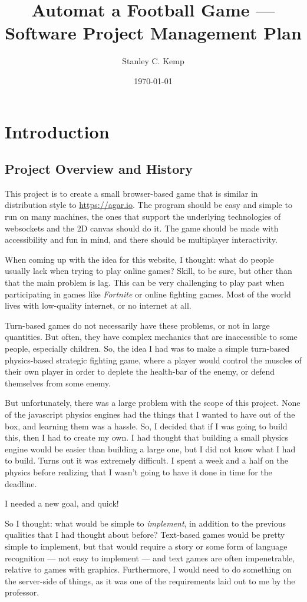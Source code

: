 \documentclass[11pt]{article}
\author{Stanley C. Kemp}
\date{\today}
\title{Automat a Football Game --- Software Project Management Plan}
\begin{document}
\maketitle
\section{Introduction}
\label{sec:org7e693b3}
\subsection{Project Overview and History}
\label{sec:orgcc8e471}
 This project is to create a small browser-based game that is similar in distribution style to \url{https://agar.io}.
The program should be easy and simple to run on many machines, the ones that support the underlying technologies 
of websockets and the 2D canvas should do it. The game should be made with accessibility and fun in mind, and there 
should be multiplayer interactivity.

When coming up with the idea for this website,
I thought: what do people usually lack when trying to play online games? Skill, to be sure, but other than that
the main problem is lag. This can be very challenging to play past when participating in games like \emph{Fortnite} or
online fighting games. Most of the world lives with low-quality internet, or no internet at all. 

Turn-based games do not necessarily have these problems, or not in large quantities. But often, they have complex
mechanics that are inaccessible to some people, especially children. So, the idea I had was to make 
a simple turn-based physics-based strategic fighting game, where a player would control the muscles of their own
player in order to deplete the health-bar of the enemy, or defend themselves from some enemy.

But unfortunately, there was a large problem with the scope of this project.
None of the javascript physics engines had the things that I wanted to have out of the box,
and learning them was a hassle. So, I decided that if I was going to build this, then I had to create my own.
I had thought that building a small physics engine would be easier than building a large one, but I did not know
what I had to build. Turns out it was extremely difficult. I spent a week and a half on the physics before realizing
that I wasn't going to have it done in time for the deadline.

I needed a new goal, and quick!

So I thought: what would be simple to \emph{implement}, in addition to the previous qualities that I had thought about
before? Text-based games would be pretty simple to implement, but that would require a story or some form of
language recognition --- not easy to implement --- and text games are often impenetrable, relative to games with
graphics. Furthermore, I would need to do something on the server-side of things, as it was one of the requirements
laid out to me by the professor.
\end{document}
